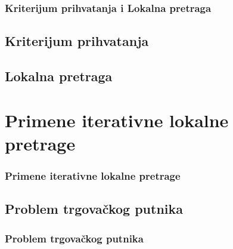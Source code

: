 \documentclass{beamer}
\begin{document}



\begin{frame}[fragile]\frametitle{Kriterijum prihvatanja i Lokalna pretraga}
	\subsection{Kriterijum prihvatanja}
	\subsection{Lokalna pretraga}
\end{frame}



\section{Primene iterativne lokalne pretrage}
\begin{frame}[fragile]\frametitle{Primene iterativne lokalne pretrage}

\end{frame}

\subsection{Problem trgovačkog putnika}
\begin{frame}[fragile]\frametitle{Problem trgovačkog putnika}

\end{frame}
\end{document}
